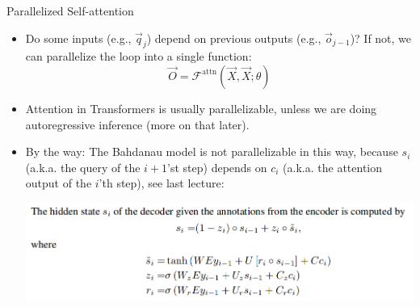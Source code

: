 
\begin{vbframe}{Parallelized Self-attention}

\vfill

\begin{itemize}
\item Do some inputs (e.g., $\vec q_j$) depend on previous outputs (e.g., $\vec o_{j-1}$)? If not, we can parallelize the loop into a single function:
$$\vec O = \mathcal{F}^\mathrm{attn}(\vec X, \vec X; \theta)$$
\item Attention in Transformers is usually parallelizable, unless we are doing autoregressive inference (more on that later).
\item By the way: The Bahdanau model is not parallelizable in this way, because $s_i$ (a.k.a. the query of the $i+1$'st step) depends on $c_i$ (a.k.a. the attention output of the $i$'th step), see last lecture:
\begin{center}
\includegraphics[width=.9\textwidth]{figure/bahdanau3}
\end{center}
\end{itemize}

\vfill

\end{vbframe}


